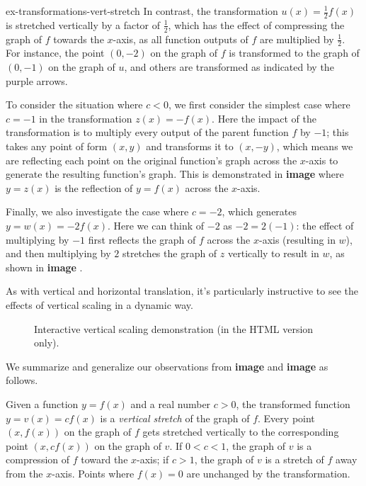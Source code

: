 \documentclass{ximera}
\begin{document}
\begin{example}{}{ex-transformations-vert-stretch}
In contrast, the transformation \(u(x) = \frac{1}{2}f(x)\) is stretched vertically by a factor of \(\frac{1}{2}\), which has the effect of compressing the graph of \(f\) towards the \(x\)-axis, as all function outputs of \(f\) are multiplied by \(\frac{1}{2}\).  For instance, the point \((0,-2)\) on the graph of \(f\) is transformed to the graph of \((0,-1)\) on the graph of \(u\), and others are transformed as indicated by the purple arrows.%


To consider the situation where \(c \lt 0\), we first consider the simplest case where \(c = -1\) in the transformation \(z(x) = -f(x)\).  Here the impact of the transformation is to multiply every output of the parent function \(f\) by \(-1\); this takes any point of form \((x,y)\) and transforms it to \((x,-y)\), which means we are reflecting each point on the original function's graph across the \(x\)-axis to generate the resulting function's graph.  This is demonstrated in \textbf{image} where \(y = z(x)\) is the reflection of \(y = f(x)\) across the \(x\)-axis.%


Finally, we also investigate the case where \(c = -2\), which generates \(y = w(x) = -2f(x)\).  Here we can think of \(-2\) as \(-2 = 2(-1)\): the effect of multiplying by \(-1\) first reflects the graph of \(f\) across the \(x\)-axis (resulting in \(w\)), and then multiplying by \(2\) stretches the graph of \(z\) vertically to result in \(w\), as shown in \textbf{image} .%
\end{example}

As with vertical and horizontal translation, it's particularly instructive to see the effects of vertical scaling in a dynamic way.%
\begin{figure}
\centering
[INTERACTIVE]\caption{Interactive vertical scaling demonstration (in the HTML version only).\label{F-transformations-vertical-scaling}}
\end{figure}
\hypertarget{p-680}{}%
We summarize and generalize our observations from \textbf{image} and \textbf{image} as follows.%

Given a function \(y = f(x)\) and a real number \(c \gt 0\), the transformed function \(y = v(x) = cf(x)\) is a \emph{vertical stretch} of the graph of \(f\).  Every point \((x,f(x))\) on the graph of \(f\) gets stretched vertically to the corresponding point \((x,cf(x))\) on the graph of \(v\).  If \(0 \lt c \lt 1\), the graph of \(v\) is a compression of \(f\) toward the \(x\)-axis; if \(c \gt 1\), the graph of \(v\) is a stretch of \(f\) away from the \(x\)-axis.  Points where \(f(x) = 0\) are unchanged by the transformation.%
\end{document}
